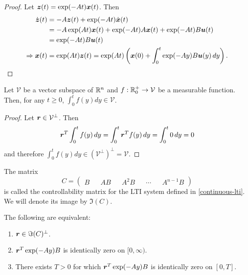 \begin{proof}
Let $\boldsymbol{z}(t) = \exp(-At) \boldsymbol{x}(t)$. Then
\begin{align*}
\dot{\boldsymbol{z}}(t) &= -A \boldsymbol{z}(t) + \exp(-At) \dot{\boldsymbol{x}}(t) \\
&= -A \exp(At) \boldsymbol{x}(t) + \exp(-At) A \boldsymbol{x}(t) + \exp(-At) B \boldsymbol{u}(t) \\
&= \exp(-At) B \boldsymbol{u}(t) \\
\Rightarrow \boldsymbol{x}(t) &= \exp(At) \boldsymbol{z}(t) = \exp(At) \left( \boldsymbol{x}(0) + \int_{0}^{t} \exp(-Ay) B \boldsymbol{u}(y) \, dy \right) .
\end{align*}
\end{proof}

\begin{lemma}
\label{integral-invariance}
Let $\mathcal{V}$ be a vector subspace of $\mathbb{R}^{n}$ and $f : \mathbb{R}^{+}_{0} \rightarrow \mathcal{V}$ be a measurable function. Then, for any $t \geq 0$, $\int_{0}^{t} f(y) dy \in \mathcal{V}$.
\end{lemma}

\begin{proof}
Let $\boldsymbol{r} \in \mathcal{V}^{\perp}$. Then
\begin{equation*}
\boldsymbol{r}^{T} \int_{0}^{t} f(y) \, dy = \int_{0}^{t} \boldsymbol{r}^{T} f(y) \, dy = \int_{0}^{t} 0 \, dy = 0
\end{equation*}
and therefore $\int_{0}^{t} f(y) dy \in (\mathcal{V}^{\perp})^{\perp} = \mathcal{V}$.
\end{proof}

The matrix
\begin{equation}
C= \begin{pmatrix} B && AB && A^{2} B && \cdots && A^{n-1}B \end{pmatrix}
\end{equation}
is called the controllability matrix for the LTI system defined in \cref{continuous-lti}. We will denote its image by $\Im(C)$.

\begin{lemma}
\label{orthogonality-equivalence}
The following are equivalent:
\begin{enumerate}
\item $\boldsymbol{r} \in \Im(C)^{\perp}$.
\item $\boldsymbol{r}^{T} \exp(-Ay) B$ is identically zero on $[0,\infty)$.
\item There exists $T>0$ for which $\boldsymbol{r}^{T} \exp(-Ay) B$ is identically zero on $[0,T]$.
\end{enumerate}
\end{lemma}

